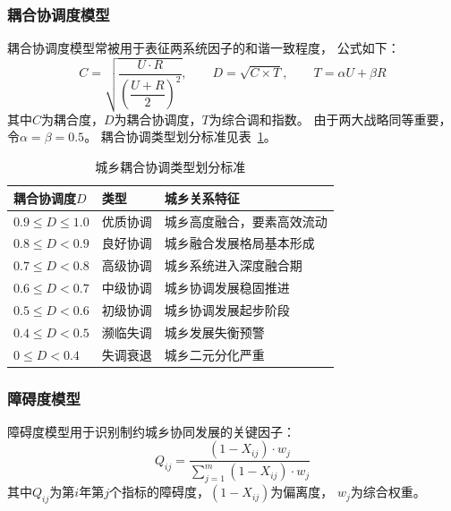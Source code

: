 \documentclass[12pt, a4paper, twoside]{ctexart}
\begin{document}
\subsubsection{耦合协调度模型}

耦合协调度模型常被用于表征两系统因子的和谐一致程度\cite{zhao2026}，
公式如下：
\begin{equation}
  C = \sqrt{\frac{U \cdot R}{\left(\dfrac{U+R}{2}\right)^{2}}}, \qquad
  D = \sqrt{C \times T}, \qquad
  T = \alpha U + \beta R
  \label{eq:coupling}
\end{equation}
其中$C$为耦合度，$D$为耦合协调度，$T$为综合调和指数。
由于两大战略同等重要，令$\alpha = \beta = 0.5$。
耦合协调类型划分标准见表~\ref{tab:typeclass}。

\begin{table}[H]
  \centering
  \caption{城乡耦合协调类型划分标准}
  \label{tab:typeclass}
  \begin{tabularx}{\linewidth}{>{\centering}p{2.5cm}
      >{\centering}p{2.5cm} X}
    \toprule
    \rowcolor{TableHead}
    \color{white}\bfseries 耦合协调度$D$ &
    \color{white}\bfseries 类型 &
    \color{white}\bfseries 城乡关系特征 \\
    \midrule
    $0.9 \le D \le 1.0$ & 优质协调 & 城乡高度融合，要素高效流动 \\
    \rowcolor{TableRow}
    $0.8 \le D < 0.9$   & 良好协调 & 城乡融合发展格局基本形成 \\
    $0.7 \le D < 0.8$   & 高级协调 & 城乡系统进入深度融合期 \\
    \rowcolor{TableRow}
    $0.6 \le D < 0.7$   & 中级协调 & 城乡协调发展稳固推进 \\
    $0.5 \le D < 0.6$   & 初级协调 & 城乡协调发展起步阶段 \\
    \rowcolor{TableRow}
    $0.4 \le D < 0.5$   & 濒临失调 & 城乡发展失衡预警 \\
    $0 \le D < 0.4$     & 失调衰退 & 城乡二元分化严重 \\
    \bottomrule
  \end{tabularx}
\end{table}

\subsubsection{障碍度模型}

障碍度模型用于识别制约城乡协同发展的关键因子\cite{zhao2026}：
\begin{equation}
  Q_{ij} = \frac{(1-X_{ij})\cdot w_j}{\displaystyle\sum_{j=1}^{m}
    (1-X_{ij})\cdot w_j}
  \label{eq:barrier}
\end{equation}
其中$Q_{ij}$为第$i$年第$j$个指标的障碍度，$(1-X_{ij})$为偏离度，
$w_j$为综合权重。
\end{document}
